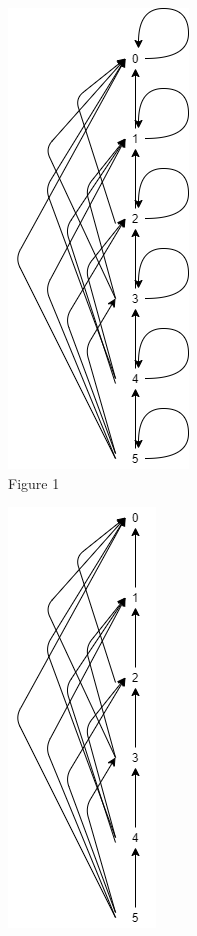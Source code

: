 \documentclass[a4 paper]{article}
\numberwithin{equation}{section}
\newcommand{\0}{\mathbf{0}}
\begin{document}
\newpage

\begin{figure}[h!]
  \centering
  \begin{subfigure}[b]{0.3\linewidth}
    \includegraphics[width=\linewidth,height=\linewidth]{hasse-1.png}
    \caption{Figure 1}
  \end{subfigure}
  \begin{subfigure}[b]{0.3\linewidth}
     \includegraphics[width=\linewidth,height=\linewidth]{hasse-2.png}

\end{subfigure}
\end{figure}
\end{document}
